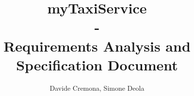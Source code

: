 \documentclass{report}
\begin{document}
	\title{\textbf{myTaxiService} \\ -  \\ \textbf{Requirements Analysis and Specification Document}}
	\author{Davide Cremona, Simone Deola}
	\maketitle

	\tableofcontents

	
	
	
	
\end{document}
